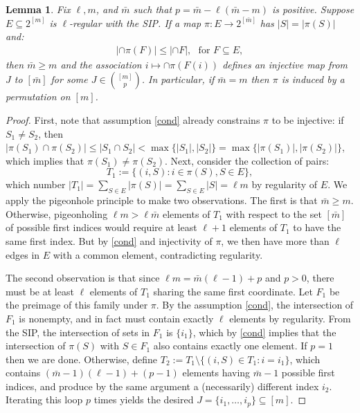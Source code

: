 \documentclass[9pt,twocolumn]{pnas-new}
\newtheorem{lemma}{Lemma}
\begin{document}
\begin{lemma}\label{NonEmptyLemma} 
Fix $\ell, m$, and $\bar m$ such that $p = \bar m - \ell(\bar m - m)$ is positive. Suppose $E \subseteq 2^{[m]}$ is $\ell$-regular with the SIP. If a map $\pi: E \to 2^{[\bar m]}$ has $|S| = |\pi(S)|$ and:
\begin{align}\label{cond}
|\cap \pi(F)| \leq |\cap F |,\ \ \   \text{for } F \subseteq E,
\end{align}
then $\bar m \geq m$ and the association $i \mapsto \cap \pi(F(i))$ defines an injective map from $J$ to $[\bar m]$ for some $J \in {[m] \choose p}$. In particular, if $\bar m = m$ then $\pi$ is induced by a permutation on $[m]$.
\end{lemma}


\begin{proof}
First, note that assumption \eqref{cond} already constrains $\pi$ to be injective:  if $S_1 \neq S_2$, then $|\pi(S_1) \cap \pi(S_2)| \leq |S_1 \cap S_2| < \max\{|S_1|, |S_2|\} = \max\{|\pi(S_1)|, |\pi(S_2)|\}$, which implies that $\pi(S_1) \neq \pi(S_2)$.  Next, consider the collection of pairs: \[T_1 := \{(i, S): i \in \pi(S), S \in E\},\] which number $|T_1| = \sum_{S \in E} |\pi(S)| = \sum_{S \in E} |S| = \ell m$ by regularity of $E$. We apply the pigeonhole principle to make two observations. 
The first is that $\bar m \geq m$. Otherwise, pigeonholing $\ell m > \ell \bar m$ elements of $T_1$ with respect to the set $[\bar m]$ of possible first indices would require at least $\ell + 1$ elements of $T_1$ to have the same first index. But by \eqref{cond} and injectivity of $\pi$, we then have more than $\ell$ edges in $E$ with a common element, contradicting regularity. 

The second observation is that since $\ell m = \bar m (\ell - 1) + p$ and $p > 0$, there must be at least $\ell$ elements of $T_1$ sharing the same first coordinate. Let $F_1$ be the preimage of this family under $\pi$.  By the assumption \eqref{cond}, the intersection of $F_1$ is nonempty, and in fact must contain exactly $\ell$ elements by regularity. 
From the SIP, the intersection of sets in $F_1$ is $\{i_1\}$, which by \eqref{cond} implies that the intersection of $\pi(S)$ with $S \in F_1$ also contains exactly one element.  If $p = 1$ then we are done. Otherwise, define $T_2 := T_1 \setminus \{(i,S) \in T_1: i = i_1\}$, which contains $(\bar m - 1)(\ell -1) + (p-1)$ elements having $\bar m - 1$ possible first indices, and produce by the same argument a (necessarily) different index $i_2$. Iterating this loop $p$ times yields the desired $J = \{i_1, \ldots, i_p\} \subseteq [m]$.
\end{proof}
\end{document}
